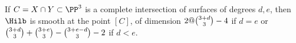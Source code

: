 \begin{exercise}
\label{hilb at a ci}
If $C = X\cap Y\subset \PP^3$ is a
%
complete intersection
 of surfaces of
degrees $d,e$, then
$\Hilb$ is smooth at the point $[C]$, of dimension $2@\tbinom{3+d}{3}-4$
if $d=e$
or $\tbinom{3+d}{3} +\tbinom{3+e}{3} -\tbinom{3+e-d}{3} -2$ if $d<e$.
\end{exercise}

